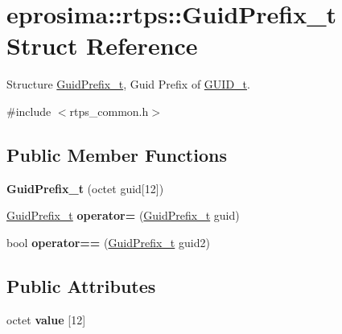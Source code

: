 \hypertarget{structeprosima_1_1rtps_1_1_guid_prefix__t}{\section{eprosima\-:\-:rtps\-:\-:\-Guid\-Prefix\-\_\-t \-Struct \-Reference}
\label{structeprosima_1_1rtps_1_1_guid_prefix__t}
}


\-Structure \hyperlink{structeprosima_1_1rtps_1_1_guid_prefix__t}{\-Guid\-Prefix\-\_\-t}, \-Guid \-Prefix of \hyperlink{structeprosima_1_1rtps_1_1_g_u_i_d__t}{\-G\-U\-I\-D\-\_\-t}.  




{\ttfamily \#include $<$rtps\-\_\-common.\-h$>$}

\subsection*{\-Public \-Member \-Functions}
\begin{DoxyCompactItemize}
\item 
\hypertarget{structeprosima_1_1rtps_1_1_guid_prefix__t_a7df3d653e30b599a719667478f90ea77}{{\bfseries \-Guid\-Prefix\-\_\-t} (octet guid\mbox{[}12\mbox{]})}\label{structeprosima_1_1rtps_1_1_guid_prefix__t_a7df3d653e30b599a719667478f90ea77}

\item 
\hypertarget{structeprosima_1_1rtps_1_1_guid_prefix__t_a1b295fe079bbf5b6ff5d6febe1c74984}{\hyperlink{structeprosima_1_1rtps_1_1_guid_prefix__t}{\-Guid\-Prefix\-\_\-t} {\bfseries operator=} (\hyperlink{structeprosima_1_1rtps_1_1_guid_prefix__t}{\-Guid\-Prefix\-\_\-t} guid)}\label{structeprosima_1_1rtps_1_1_guid_prefix__t_a1b295fe079bbf5b6ff5d6febe1c74984}

\item 
\hypertarget{structeprosima_1_1rtps_1_1_guid_prefix__t_a70af4900807389bfdd8c5ad84803e8fc}{bool {\bfseries operator==} (\hyperlink{structeprosima_1_1rtps_1_1_guid_prefix__t}{\-Guid\-Prefix\-\_\-t} guid2)}\label{structeprosima_1_1rtps_1_1_guid_prefix__t_a70af4900807389bfdd8c5ad84803e8fc}

\end{DoxyCompactItemize}
\subsection*{\-Public \-Attributes}
\begin{DoxyCompactItemize}
\item 
\hypertarget{structeprosima_1_1rtps_1_1_guid_prefix__t_a96bb69681b4125340533e969abe53342}{octet {\bfseries value} \mbox{[}12\mbox{]}}\label{structeprosima_1_1rtps_1_1_guid_prefix__t_a96bb69681b4125340533e969abe53342}

\end{DoxyCompactItemize}


